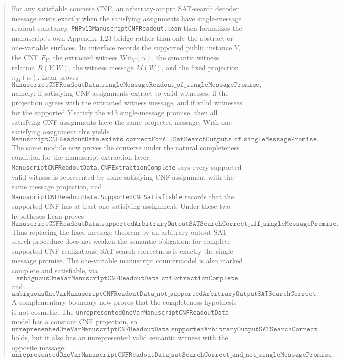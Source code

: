 \documentclass[11pt]{article}
\theoremstyle{remark}
\begin{document}
\begin{abstract}
\[\]
For any satisfiable concrete CNF, an arbitrary-output SAT-search decoder message exists exactly when
the satisfying assignments have single-message readout constancy.
\texttt{PNPv13ManuscriptCNFReadout.lean} then formalizes the manuscript's own Appendix~I.23
bridge rather than only the abstract or one-variable surfaces.  Its interface records the supported
public instance \(Y\), the CNF \(F_Y\), the extracted witness \(\mathrm{Wit}_Y(\alpha)\), the
semantic witness relation \(R(Y,W)\), the witness message \(M(W)\), and the fixed projection
\(\pi_M(\alpha)\).  Lean proves
\[
  \texttt{ManuscriptCNFReadoutData.singleMessageReadout\_of\_singleMessagePromise},
\]
namely: if satisfying CNF assignments extract to valid witnesses, if the projection agrees with the
extracted witness message, and if valid witnesses for the supported \(Y\) satisfy the v13
single-message promise, then all satisfying CNF assignments have the same projected message.  With
one satisfying assignment this yields
\[
  \texttt{ManuscriptCNFReadoutData.exists\_correctForAllSatSearchOutputs\_of\_singleMessagePromise}.
\]
The same module now proves the converse under the natural completeness condition for the manuscript
extraction layer.  \texttt{ManuscriptCNFReadoutData.CNFExtractionComplete} says every supported
valid witness is represented by some satisfying CNF assignment with the same message projection, and
\texttt{ManuscriptCNFReadoutData.SupportedCNFSatisfiable} records that the supported CNF has at
least one satisfying assignment.  Under these two hypotheses Lean proves
\[
  \texttt{ManuscriptCNFReadoutData.supportedArbitraryOutputSATSearchCorrect\_iff\_singleMessagePromise}.
\]
Thus replacing the fixed-message theorem by an arbitrary-output SAT-search procedure does not weaken
the semantic obligation: for complete supported CNF realizations, SAT-search correctness is exactly
the single-message promise.  The one-variable manuscript countermodel is also marked complete and
satisfiable, via
\[
  \texttt{ambiguousOneVarManuscriptCNFReadoutData\_cnfExtractionComplete}
\]
and
\[
  \texttt{ambiguousOneVarManuscriptCNFReadoutData\_not\_supportedArbitraryOutputSATSearchCorrect}.
\]
A complementary boundary now proves that the completeness hypothesis is not cosmetic.  The
\texttt{unrepresentedOneVarManuscriptCNFReadoutData} model has a constant CNF projection, so
\[
  \texttt{unrepresentedOneVarManuscriptCNFReadoutData\_supportedArbitraryOutputSATSearchCorrect}
\]
holds, but it also has an unrepresented valid semantic witness with the opposite message:
\[
  \texttt{unrepresentedOneVarManuscriptCNFReadoutData\_satSearchCorrect\_and\_not\_singleMessagePromise},
\]
\end{abstract}
\end{document}
